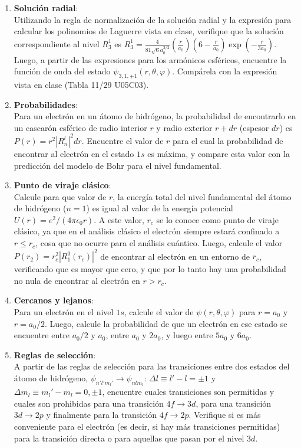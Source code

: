\documentclass[a4paper,12pt]{article}
\begin{document}
\begin{enumerate}
	\item {\bf{Solución radial}}:\\
		Utilizando la regla de normalización de la solución radial y la
		expresión para calcular los polinomios de Laguerre vista en clase,
		verifique que la solución correspondiente al nivel $R_3^1$ es $R_3
		^1=\frac{4}{81 \sqrt{6} a_0^{3/2}} \left (\frac{r}{a_0} \right ) \left (6 - \frac{r}{a_0} \right ) \exp\left (-\frac{r}{3 a_0}\right )$.
		Luego, a partir de las expresiones para los armónicos esféricos,
		encuentre la función de onda del estado
		$\psi_{3,1,+1}(r,\theta,\varphi)$. Compárela con la expresión vista en
		clase (Tabla 11/29 U05C03).

	\item {\bf{Probabilidades}}:\\
		Para un electrón en un átomo de hidrógeno, la probabilidad de
		encontrarlo en un cascarón esférico de radio interior $r$ y radio
		exterior $r+dr$ (espesor $dr$) es $P(r)=r^2 |R_n^l|^2 dr$. Encuentre el
		valor de $r$ para el cual la probabilidad de encontrar al electrón en
		el estado $1s$ es máxima, y compare esta valor con la predicción del
		modelo de Bohr para el nivel fundamental.

	\item {\bf{Punto de viraje clásico}}:\\
		Calcule para que valor de $r$, la energía total del nivel fundamental
		del átomo de hidrógeno ($n=1$) es igual al valor de la energía
		potencial $U(r) = e^2/(4 \pi \epsilon_0 r)$. A este valor, $r_c$ se lo
		conoce como punto de viraje clásico, ya que en el análisis clásico el
		electrón siempre estará confinado a $r\leq r_c$, cosa que no ocurre
		para el análisis cuántico. Luego, calcule el valor $P(r_2)=r_c^2
		|R_1^0(r_c)|^2$ de encontrar al electrón en un entorno de $r_c$,
		verificando que es mayor que cero, y que por lo tanto hay una
		probabilidad no nula de encontrar al electrón en $r>r_c$.
	
	\item {\bf{Cercanos y lejanos}}:\\
		Para un electrón en el nivel $1s$, calcule el valor de
		$\psi(r,\theta,\varphi)$ para $r=a_0$ y $r=a_0/2$. Luego, calcule la
		probabilidad de que un electrón en ese estado se encuentre entre
		$a_0/2$ y $a_0$, entre $a_0$ y $2 a_0$, y luego entre $5 a_0$ y $6
		a_0$.

	\item {\bf{Reglas de selección}}:\\
		A partir de las reglas de selección para las transiciones entre dos
		estados del átomo de hidrógeno, $\psi_{n' l' m_l'} \to \psi_{n l m_l}$:
		$\Delta l \equiv l'-l = \pm 1$ y $\Delta m_l \equiv m_l' - m_l = 0, \pm
		1$, encuentre cuales transiciones son permitidas y cuales son
		prohibidas para una transición $4f \to 3d$, para una transición $3d
		\to 2p$ y finalmente para la transición $4f \to 2p$. Verifique si es
		más conveniente para el electrón (es decir, si hay más transiciones
		permitidas) para la transición directa o para aquellas que pasan por el
		nivel $3d$. 
\end{enumerate}
\end{document}
